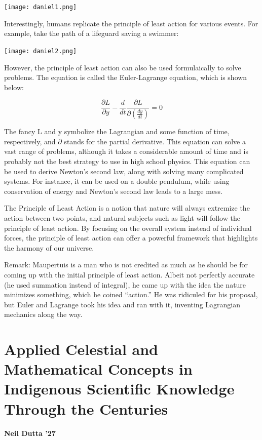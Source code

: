 \documentclass{article}
\begin{document}
\begin{multicols}{2}
\begin{center}
    \texttt{[image: daniel1.png]}
\end{center}

Interestingly, humans replicate the principle of least action for various events. For example, take the path of a lifeguard saving a swimmer:

\begin{center}
    \texttt{[image: daniel2.png]}
\end{center}

However, the principle of least action can also be used formulaically to solve problems. The equation is called the Euler-Lagrange equation, which is shown below: 

\begin{equation*}
    \frac{\partial L}{\partial y} - \frac{d}{dt} \frac{\partial L}{\partial (\frac{dy}{dt})} = 0
\end{equation*}

The fancy L and y symbolize the Lagrangian and some function of time, respectively, and $\partial$ stands for the partial derivative. This equation can solve a vast range of problems, although it takes a considerable amount of time and is probably not the best strategy to use in high school physics. This equation can be used to derive Newton’s second law, along with solving many complicated systems. For instance, it can be used on a double pendulum, while using conservation of energy and Newton’s second law leads to a large mess.

The Principle of Least Action is a notion that nature will always extremize the action between two points, and natural subjects such as light will follow the principle of least action. By focusing on the overall system instead of individual forces, the principle of least action can offer a powerful framework that highlights the harmony of our universe.

Remark: Maupertuis is a man who is not credited as much as he should be for coming up with the initial principle of least action. Albeit not perfectly accurate (he used summation instead of integral), he came up with the idea the nature minimizes something, which he coined “action.” He was ridiculed for his proposal, but Euler and Lagrange took his idea and ran with it, inventing Lagrangian mechanics along the way.

\section*{Applied Celestial and Mathematical Concepts in Indigenous Scientific Knowledge Through the Centuries}
\noindent\textbf{Neil Dutta '27}


\end{multicols}
\end{document}
